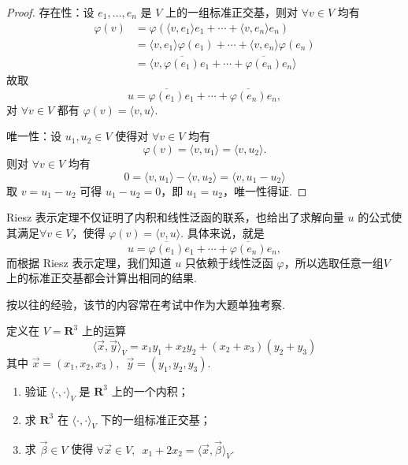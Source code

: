 \begin{proof}
    存在性：设 $e_1, \ldots , e_n$ 是 $ V $ 上的一组标准正交基，则对 $\forall v \in V $ 均有
    \begin{align*}
        \varphi (v) & = \varphi(\langle v, e_1 \rangle e_1 + \cdots + \langle v, e_n \rangle e_n )           \\
                    & = \langle v, e_1 \rangle \varphi (e_1) + \cdots + \langle v, e_n \rangle \varphi (e_n) \\
                    & = \langle v, \overline{\varphi(e_1)}e_1 + \cdots + \overline{\varphi(e_n)}e_n \rangle
    \end{align*}
    故取
    \[ u = \overline{\varphi(e_1)}e_1 + \cdots + \overline{\varphi(e_n)}e_n, \]
    对 $\forall v \in V$ 都有 $\varphi(v) = \langle v, u \rangle $.

    唯一性：设 $ u_1, u_2 \in V $ 使得对 $\forall v \in V $ 均有
    \[\varphi(v) = \langle v, u_1 \rangle = \langle v, u_2 \rangle.\]
    则对 $\forall v \in V $ 均有
    \[ 0 = \langle v, u_1 \rangle - \langle v, u_2 \rangle = \langle v, u_1 - u_2 \rangle\]
    取 $ v = u_1 - u_2 $ 可得 $ u_1 - u_2 = 0 $，即 $ u_1 = u_2 $，唯一性得证.
\end{proof}

Riesz 表示定理不仅证明了内积和线性泛函的联系，也给出了求解向量 $ u $ 的公式使其满足$ \forall v \in V $，使得 $ \varphi(v) = \langle v, u\rangle $. 具体来说，就是
\[ u = \overline{\varphi(e_1)}e_1 + \cdots + \overline{\varphi(e_n)}e_n, \]
而根据 Riesz 表示定理，我们知道 $ u $ 只依赖于线性泛函 $ \varphi $，所以选取任意一组$ V $ 上的标准正交基都会计算出相同的结果.

按以往的经验，该节的内容常在考试中作为大题单独考察.
\begin{example}
    定义在 $ V = \mathbf{R}^3 $ 上的运算
    \[ \langle \vec{x}, \vec{y} \rangle_V = x_1 y_1 + x_2 y_2 + (x_2 + x_3)(y_2 + y_3) \]
    其中 $ \vec{x} = (x_1, x_2, x_3),\enspace \vec{y} = (y_1, y_2, y_3) $.
    \begin{enumerate}
        \item 验证 $ \langle \cdot, \cdot \rangle_V $ 是 $ \mathbf{R}^3 $ 上的一个内积；

        \item 求 $ \mathbf{R}^3 $ 在 $ \langle \cdot, \cdot \rangle_V $ 下的一组标准正交基；

        \item 求 $ \vec{\beta} \in V $ 使得 $ \forall \vec{x} \in V,\enspace x_1 + 2x_2 = \langle \vec{x}, \vec{\beta} \rangle_V $.
    \end{enumerate}
\end{example}


